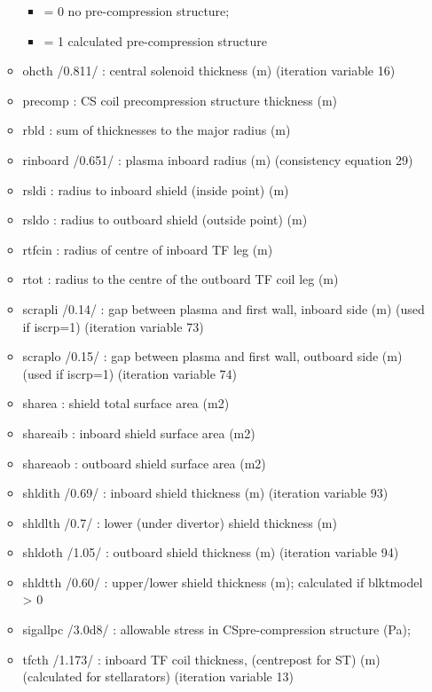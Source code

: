 \documentclass[
]{article}
\providecommand{\tightlist}{%
  \setlength{\itemsep}{0pt}\setlength{\parskip}{0pt}}
\begin{document}
\begin{itemize}
\begin{itemize}
    \begin{itemize}
    \tightlist
    \item
      = 0 no pre-compression structure;
    \item
      = 1 calculated pre-compression structure
    \end{itemize}
  \item
    ohcth /0.811/ : central solenoid thickness (m) (iteration variable
    16)
  \item
    precomp : CS coil precompression structure thickness (m)
  \item
    rbld : sum of thicknesses to the major radius (m)
  \item
    rinboard /0.651/ : plasma inboard radius (m) (consistency equation
    29)
  \item
    rsldi : radius to inboard shield (inside point) (m)
  \item
    rsldo : radius to outboard shield (outside point) (m)
  \item
    rtfcin : radius of centre of inboard TF leg (m)
  \item
    rtot : radius to the centre of the outboard TF coil leg (m)
  \item
    scrapli /0.14/ : gap between plasma and first wall, inboard side (m)
    (used if iscrp=1) (iteration variable 73)
  \item
    scraplo /0.15/ : gap between plasma and first wall, outboard side
    (m) (used if iscrp=1) (iteration variable 74)
  \item
    sharea : shield total surface area (m2)
  \item
    shareaib : inboard shield surface area (m2)
  \item
    shareaob : outboard shield surface area (m2)
  \item
    shldith /0.69/ : inboard shield thickness (m) (iteration variable
    93)
  \item
    shldlth /0.7/ : lower (under divertor) shield thickness (m)
  \item
    shldoth /1.05/ : outboard shield thickness (m) (iteration variable
    94)
  \item
    shldtth /0.60/ : upper/lower shield thickness (m); calculated if
    blktmodel \textgreater{} 0
  \item
    sigallpc /3.0d8/ : allowable stress in CSpre-compression structure
    (Pa);
  \item
    tfcth /1.173/ : inboard TF coil thickness, (centrepost for ST) (m)
    (calculated for stellarators) (iteration variable 13)

\end{itemize}
\end{itemize}
\end{document}
